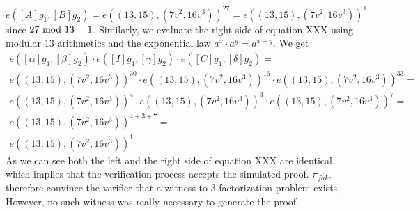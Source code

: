 \begin{example}
$$
e([A]g_1,[B]g_2) = e((13,15),(7v^2,16v^3))^{27} =e((13,15),(7v^2,16v^3))^{1}
$$
since $27 \text{ mod } 13=1$. Similarly, we evaluate the right side of equation XXX using modular $13$ arithmetics and the exponential law $a^x\cdot a^y = a^{x+y}$. We get
\begin{align*}
e([\alpha]g_1,[\beta]g_2)\cdot e([I]g_1,[\gamma]g_2)\cdot e([C]g_1,[\delta]g_2) =\\
e((13,15),(7v^2,16v^3))^{30}\cdot e((13,15),(7v^2,16v^3))^{16}\cdot e((13,15),(7v^2,16v^3))^{33} =\\
e((13,15),(7v^2,16v^3))^{4}\cdot e((13,15),(7v^2,16v^3))^{3}\cdot e((13,15),(7v^2,16v^3))^{7} =\\
e((13,15),(7v^2,16v^3))^{4+3+7} = \\
e((13,15),(7v^2,16v^3))^{1}
\end{align*}
As we can see both the left and the right side of equation XXX are identical, which implies that the verification process accepts the simulated proof. $\pi_{fake}$ therefore convince the verifier that a witness to $3$-factorization problem exists, However, no such witness was really necessary to generate the proof.
\end{example}










